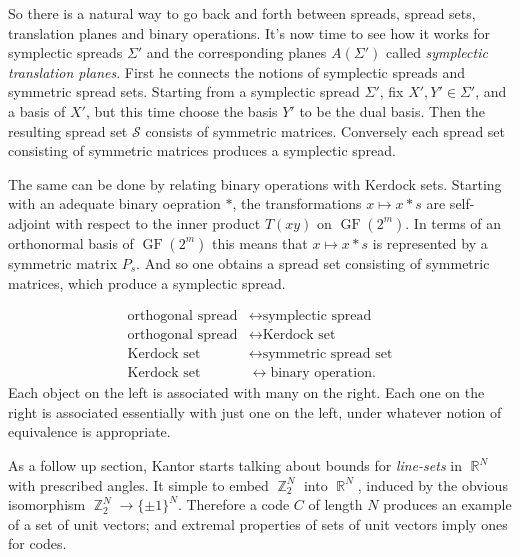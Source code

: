 \documentclass[a4paper]{article}
\DeclareMathOperator{\R}{\mathbb{R}}
\DeclareMathOperator{\Z}{\mathbb{Z}}
\DeclareMathOperator{\GF}{GF}
\begin{document}
  So there is a natural way to go back and forth between
  spreads, spread sets, translation planes and binary
  operations. It's now time to see how it works for
  symplectic spreads $\Sigma'$ and the corresponding planes
  $A(\Sigma')$ called \textit{symplectic translation
  planes}. First he connects the notions of symplectic
  spreads and symmetric spread sets. Starting from a
  symplectic spread $\Sigma'$, fix $X',Y' \in \Sigma'$, and
  a basis of $X'$, but this time choose the basis $Y'$ to be
  the dual basis. Then the resulting spread set $\mathcal S$ 
  consists of symmetric matrices. Conversely each spread set
  consisting of symmetric matrices produces a symplectic
  spread.

  The same can be done by relating binary operations with
  Kerdock sets. Starting with an adequate binary oepration
  $*$, the transformations $x \mapsto x * s$ are
  self-adjoint with respect to the inner product $T(xy)$ on
  $\GF(2^{m})$. In terms of an orthonormal basis of
  $\GF(2^{m})$ this means that $x \mapsto x * s$ is
  represented by a symmetric matrix $P_s$. And so one
  obtains a spread set consisting of symmetric matrices,
  which produce a symplectic spread.

  \begin{align*}
    \text{orthogonal spread}
    &\leftrightarrow
    \text{symplectic spread} \\
    \text{orthogonal spread}
    &\leftrightarrow
    \text{Kerdock set} \\
    \text{Kerdock set}
    &\leftrightarrow
    \text{symmetric spread set} \\
    \text{Kerdock set}
    &\leftrightarrow
    \text{binary operation}.
  \end{align*}
  Each object on the left is associated with many on the
  right. Each one on the right is associated essentially
  with just one on the left, under whatever notion of
  equivalence is appropriate.

  As a follow up section, Kantor starts talking about bounds
  for \textit{line-sets} in $\R^{N}$ with prescribed angles.
  It simple to embed $\Z_2^{N}$ into $\R^{N}$, induced by
  the obvious isomorphism $\Z_2^{N} \to \{\pm 1\}^{N}$.
  Therefore a code $C$ of length $N$ produces an example of
  a set of unit vectors; and extremal properties of sets of
  unit vectors imply ones for codes.
\end{document}
